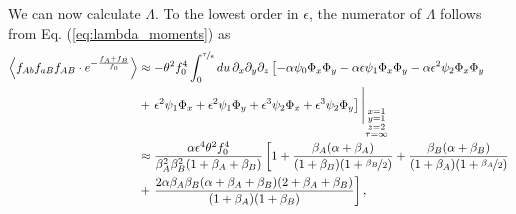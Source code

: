 \documentclass[aps,rmp,twocolumn,groupedaddress,floatfix,notitlepage]{revtex4-1}
\begin{document}
We can now calculate $\Lambda$. To the lowest order in $\epsilon$, the numerator of $\Lambda$ follows from Eq. (\ref{eq:lambda_moments}) as
\begin{align}\label{eq:lambda_num_large_rho}
    \left\langle f_{Ab}f_{aB}f_{AB}\cdot e^{-\frac{f_{A}+f_{B}}{f_0}}\right\rangle
 &\approx -\theta^2 f_0^4 \int_0^{\nicefrac{\tau}{\epsilon}} du\, \partial_x\partial_y\partial_z \left[-\alpha \psi_0\Phi_x\Phi_y -\alpha \epsilon \psi_1 \Phi_x\Phi_y -\alpha \epsilon^2 \psi_2 \Phi_x\Phi_y \right. \\ \nonumber
 &+ \left. \epsilon^2 \psi_1\Phi_x + \epsilon^2 \psi_1\Phi_y + \epsilon^3 \psi_2\Phi_x + \epsilon^3 \psi_2\Phi_y \right]\Bigg\vert_{\substack{x=1 \\ y=1 \\ z=2 \\ \tau=\infty}} \\ \nonumber
 &\approx \frac{\alpha \epsilon^4 \theta^2 f_0^4}{\beta_A^2 \beta_B^2 (1+\beta_A+\beta_B)} \left[1 + \frac{\beta_A(\alpha+\beta_A)}{(1+\beta_B)(1+\nicefrac{\beta_B}{2}) } +  \frac{\beta_B(\alpha+\beta_B)}{(1+\beta_A)(1+\nicefrac{\beta_A}{2})} \right. \\ \nonumber
 &+\left. \frac{2 \alpha \beta_A \beta_B (\alpha+\beta_A+\beta_B)(2+\beta_A+\beta_B)}{(1+\beta_A)(1+\beta_B)} \right]
 ,
\end{align}
\end{document}
